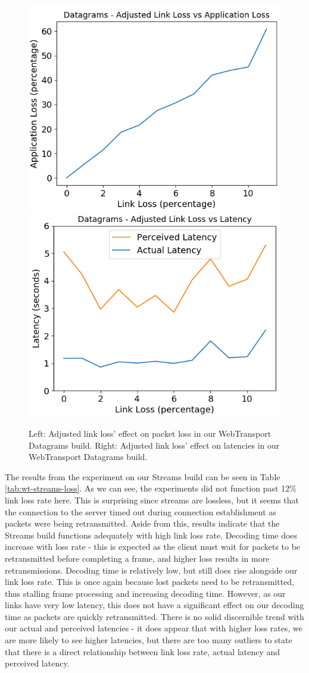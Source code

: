 \begin{figure}[h]
    \centering
    \includegraphics[width=0.49\linewidth]{images/loss/dg-loss-loss.png}
    \includegraphics[width=0.49\linewidth]{images/loss/dg-loss-lat.png}
    \caption{Left: Adjusted link loss' effect on packet loss in our WebTransport Datagrams build. Right: Adjusted link loss' effect on latencies in our WebTransport Datagrams build.}
    \label{fig:dg-loss-lat} 
\end{figure}

The results from the experiment on our Streams build can be seen in Table \ref{tab:wt-streams-loss}. As we can see, the experiments did not function past 12\% link loss rate here. This is surprising since streams are lossless, but it seems that the connection to the server timed out during connection establishment as packets were being retransmitted. Aside from this, results indicate that the Streams build functions adequately with high link loss rate. Decoding time does increase with loss rate - this is expected as the client must wait for packets to be retransmitted before completing a frame, and higher loss results in more retransmissions. Decoding time is relatively low, but still does rise alongside our link loss rate. This is once again because lost packets need to be retransmitted, thus stalling frame processing and increasing decoding time. However, as our links have very low latency, this does not have a significant effect on our decoding time as packets are quickly retransmitted. There is no solid discernible trend with our actual and perceived latencies - it does appear that with higher loss rates, we are more likely to see higher latencies, but there are too many outliers to state that there is a direct relationship between link loss rate, actual latency and perceived latency.

